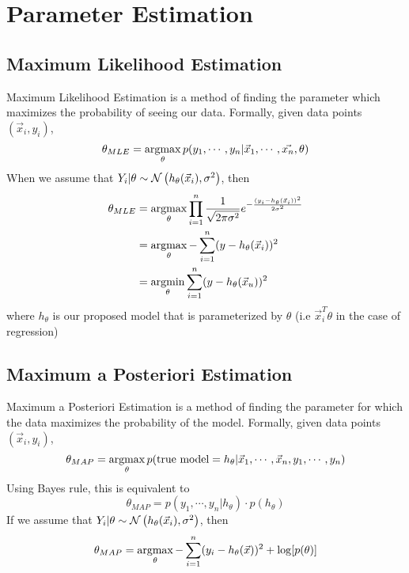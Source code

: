 \section{Parameter Estimation}
\subsection{Maximum Likelihood Estimation}
Maximum Likelihood Estimation is a method of finding the parameter which maximizes the probability of seeing our data. Formally, given data points $(\vec{x}_i, y_i)$,
\[
  \theta_{MLE} = \operatorname*{argmax}_{\theta} p(y_1,\cdots,y_n|\vec{x}_1,\cdots,\vec{x_n}, \theta)
\]
When we assume that $Y_i|\theta\sim\mathcal{N}\left(h_\theta(\vec{x}_i), \sigma^2\right)$, then
\begin{align*}
  \theta_{MLE} &= \operatorname*{argmax}_{\theta}\prod_{i=1}^n\frac{1}{\sqrt{2\pi\sigma^2}}e^{-\frac{(y_i-h_\theta(\vec{x}_i))^2}{2\sigma^2}}\\
  &= \operatorname*{argmax}_\theta-\sum_{i=1}^n(y-h_\theta(\vec{x}_i))^2\\
  &= \operatorname*{argmin}_\theta \sum_{i=1}^n(y-h_\theta(\vec{x}_u))^2
\end{align*}
where $h_\theta$ is our proposed model that is parameterized by $\theta$ (i.e $\vec{x}_i^T\theta$ in the case of regression)
\subsection{Maximum a Posteriori Estimation}
Maximum a Posteriori Estimation is a method of finding the parameter for which the data maximizes the probability of the model. Formally, given data points $(\vec{x}_i, y_i)$,
\[
  \theta_{MAP} = \operatorname*{argmax}_{\theta} p(\text{true model}= h_{\theta}|\vec{x}_1,\cdots, \vec{x}_n, y_1,\cdots, y_n)
\]
Using Bayes rule, this is equivalent to
\[
  \theta_{MAP} = p(y_1,\cdots,y_n|h_\theta) \cdot p(h_\theta)
\]
If we assume that $Y_i|\theta\sim\mathcal{N}\left(h_\theta(\vec{x}_i), \sigma^2\right)$, then
\[
  \theta_{MAP} = \operatorname*{argmax}_\theta -\sum_{i=1}^n(y_i-h_\theta(\vec{x}))^2 + \log[p(\theta)]
\]
